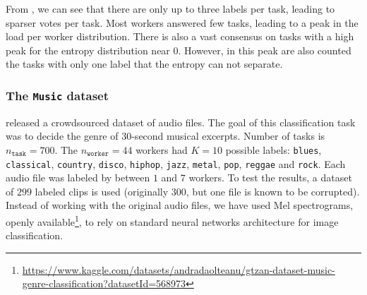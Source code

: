 From , we can see that there are only up to three labels per task, leading to sparser votes per task.
Most workers answered few tasks, leading to a peak in the load per worker distribution.
There is also a vast consensus on tasks with a high peak for the entropy distribution near $0$. However, in this peak are also counted the tasks with only one label that the entropy can not separate.

\subsubsection{The \texttt{Music} dataset}
\label{subsubsec:music}


\citet{rodrigues2014gaussian} released a crowdsourced dataset of audio files.
The goal of this classification task was to decide the genre of $ 30$-second musical excerpts. Number of tasks is $n_{\texttt{task}}=700$.
The $n_{\texttt{worker}}=44$ workers had $K=10$ possible labels: \texttt{blues}, \texttt{classical}, \texttt{country}, \texttt{disco}, \texttt{hiphop}, \texttt{jazz}, \texttt{metal}, \texttt{pop}, \texttt{reggae} and \texttt{rock}.
Each audio file was labeled by between $1$ and $7$ workers.
To test the results, a dataset of $299$ labeled clips is used (originally $300$, but one file is known to be corrupted).
Instead of working with the original audio files, we have used Mel spectrograms, openly available\footnote{ \scriptsize \url{https://www.kaggle.com/datasets/andradaolteanu/gtzan-dataset-music-genre-classification?datasetId=568973}}, to rely on standard neural networks architecture for image classification.

